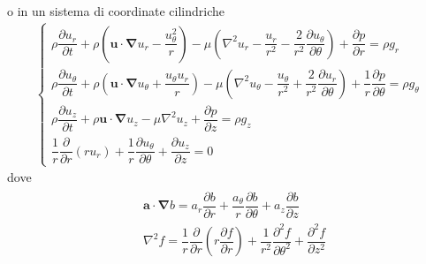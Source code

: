 \documentclass[letterpaper,10pt,italian]{jupyterBook}
\begin{document}
\sphinxAtStartPar
o in un sistema di coordinate cilindriche
\begin{equation*}
\begin{split}\begin{cases}
\rho \dfrac{\partial u_r}{\partial t}
+ \rho \left( \mathbf{u} \cdot \mathbf{\nabla}u_r - \dfrac{u_\theta^2}{r} \right)
- \mu \left(\nabla^2 u_r 
   - \dfrac{u_r}{r^2} 
   - \dfrac{2}{r^2}\dfrac{\partial u_\theta}{\partial \theta} \right)  
   + \dfrac{\partial p}{\partial r} = \rho g_r \\
\rho \dfrac{\partial u_\theta}{\partial t}
+ \rho \left( \mathbf{u} \cdot \mathbf{\nabla} u_\theta + \dfrac{u_\theta u_r}{r} \right)
- \mu \left(\nabla^2 u_\theta 
   - \dfrac{u_\theta}{r^2} 
   + \dfrac{2}{r^2}\dfrac{\partial u_r}{\partial \theta}  \right) 
+ \dfrac{1}{r} \dfrac{\partial p}{\partial \theta} = \rho g_\theta\\
\rho \dfrac{\partial u_z}{\partial t}
+ \rho \mathbf{u} \cdot \mathbf{\nabla} u_z
- \mu \nabla^2 u_z
+ \dfrac{\partial p}{\partial z} = \rho g_z \\
\dfrac{1}{r}\dfrac{\partial}{\partial r}\left( r u_r \right) 
+ \dfrac{1}{r}\dfrac{\partial u_\theta}{\partial \theta} 
+ \dfrac{\partial u_z}{\partial z} = 0
\end{cases}\end{split}
\end{equation*}
\sphinxAtStartPar
dove
\begin{equation*}
\begin{split}\begin{aligned}
  & \mathbf{a} \cdot \mathbf{\nabla} b = a_r \dfrac{\partial b}{\partial r} 
     + \dfrac{a_\theta}{r} \dfrac{\partial b}{\partial \theta}  
     + a_z \dfrac{\partial b}{\partial z} \\
  & \nabla^2 f = \dfrac{1}{r}\dfrac{\partial}{\partial r}
                      \left(r \dfrac{\partial f}{\partial r} \right) +
               \dfrac{1}{r^2} \dfrac{\partial^2 f}{\partial \theta^2} + 
               \dfrac{\partial^2 f}{\partial z^2} 
  \end{aligned}\end{split}
\end{equation*}
\end{document}
